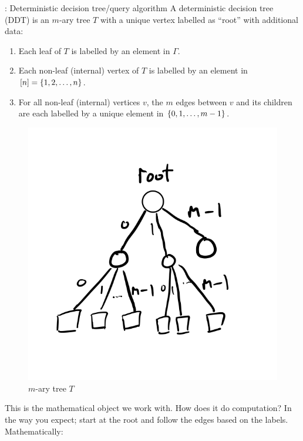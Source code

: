 \begin{defbox}{: Deterministic decision tree/query algorithm}{}
    A deterministic decision tree (DDT) is an $m$-ary tree $T$ with a unique vertex labelled as ``root'' with additional data:
    \begin{enumerate}
        \item Each leaf of $T$ is labelled by an element in $\Gamma$. 
        \item Each non-leaf (internal) vertex of $T$ is labelled by an element in $[n] = \set{1, 2, \ldots, n}$. 
        \item For all non-leaf (internal) vertices $v$, the $m$ edges between $v$ and its children are each labelled by a unique element in $\set{0, 1, \ldots, m-1}$.
    \end{enumerate}
\end{defbox}

\begin{figure}[htbp!]
    \centering
    \includegraphics[scale=0.8]{Images/fig-lec1-mary.png}
    \caption{$m$-ary tree $T$}
    \label{lec1-mary}
\end{figure}


This is the mathematical object we work with. How does it do computation? In the way you expect; start at the root and follow the edges based on the labels. Mathematically:

